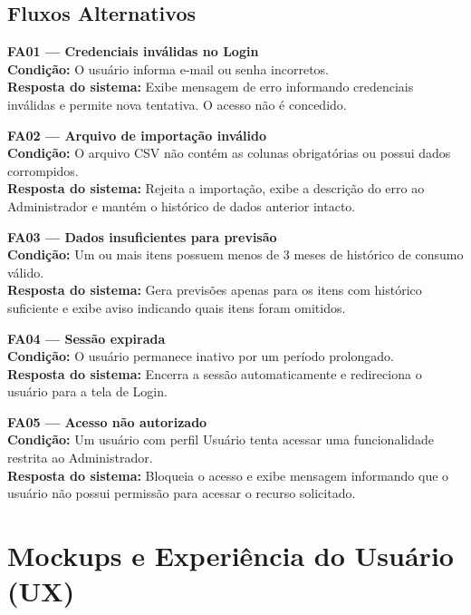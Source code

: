 \documentclass[12pt,a4paper]{article}
\begin{document}
\subsection{Fluxos Alternativos}

\vspace{0.4cm}
\noindent\textbf{FA01 — Credenciais inválidas no Login} \\
\textbf{Condição:} O usuário informa e-mail ou senha incorretos. \\
\textbf{Resposta do sistema:} Exibe mensagem de erro informando credenciais
inválidas e permite nova tentativa. O acesso não é concedido.

\vspace{0.4cm}
\noindent\textbf{FA02 — Arquivo de importação inválido} \\
\textbf{Condição:} O arquivo CSV não contém as colunas obrigatórias ou
possui dados corrompidos. \\
\textbf{Resposta do sistema:} Rejeita a importação, exibe a descrição do
erro ao Administrador e mantém o histórico de dados anterior intacto.

\vspace{0.4cm}
\noindent\textbf{FA03 — Dados insuficientes para previsão} \\
\textbf{Condição:} Um ou mais itens possuem menos de 3 meses de histórico
de consumo válido. \\
\textbf{Resposta do sistema:} Gera previsões apenas para os itens com
histórico suficiente e exibe aviso indicando quais itens foram omitidos.

\vspace{0.4cm}
\noindent\textbf{FA04 — Sessão expirada} \\
\textbf{Condição:} O usuário permanece inativo por um período prolongado. \\
\textbf{Resposta do sistema:} Encerra a sessão automaticamente e redireciona
o usuário para a tela de Login.

\vspace{0.4cm}
\noindent\textbf{FA05 — Acesso não autorizado} \\
\textbf{Condição:} Um usuário com perfil Usuário tenta acessar uma
funcionalidade restrita ao Administrador. \\
\textbf{Resposta do sistema:} Bloqueia o acesso e exibe mensagem informando
que o usuário não possui permissão para acessar o recurso solicitado.

\section{Mockups e Experiência do Usuário (UX)}
\end{document}
